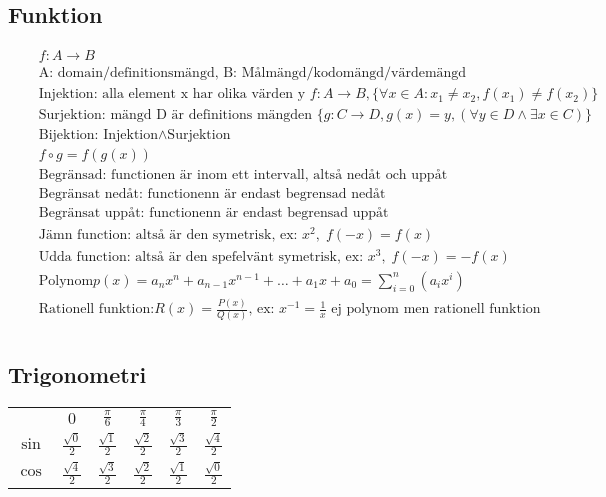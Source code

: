 \documentclass{article}
\begin{document}
\newpage

\subsection{Funktion}
\begin{align*}
  &\quad  f: A \to B \\
  &\quad  \text{A: domain/definitionsmängd, B: Målmängd/kodomängd/värdemängd} \\
  &\quad  \text{Injektion: alla element x har olika värden y } f: A \to B,
  \{{\forall x \in A: x_1 \neq x_2, f(x_1) \neq f(x_2)}\} \\
  &\quad  \text{Surjektion: mängd D är definitions mängden } \{g: C \to D, g(x)=y,
  (\forall y \in D \land \exists x \in C)\} \\
  &\quad  \text{Bijektion: } \text{Injektion} \land \text{Surjektion}  \\
  &\quad  f \circ g = f(g(x)) \\
  &\quad  \text{Begränsad: functionen är inom ett intervall, altså nedåt och uppåt} \\
  &\quad  \text{Begränsat nedåt: functionenn är endast begrensad nedåt} \\
  &\quad  \text{Begränsat uppåt: functionenn är endast begrensad uppåt} \\
  &\quad  \text{Jämn function: altså är den symetrisk, ex: } x^2, \; f(-x)=f(x) \\
  &\quad  \text{Udda function: altså är den spefelvänt symetrisk, ex: } x^3, \; f(-x)=-f(x) \\
  &\quad  \text{Polynom} p(x)=a_nx^n +a_{n-1}x^{n-1}+ \ldots +a_1x +a_0
  = \displaystyle\sum _ { i=0 } ^ { n } (a_i x^{i}) \\
  &\quad  \text{Rationell funktion:} R(x)=\frac{P(x)}{Q(x)} \text{, ex: } x^{-1}
  =\frac{1}{x} \text{ ej polynom men rationell funktion} \\
\end{align*}


\newpage

\subsection{Trigonometri}
\begin{center}
\begin{tabular}{ |c|c|c|c|c|c| } 
 \hline
        & $0$                  & $\frac{\pi}{6}$      & $\frac{\pi}{4}$      & $\frac{\pi}{3}$    & $\frac{\pi}{2}$ \\ 
 $\sin$ & $\frac{\sqrt{0}}{2}$ & $\frac{\sqrt{1}}{2}$ & $\frac{\sqrt{2}}{2}$ & $\frac{\sqrt{3}}{2}$ & $\frac{\sqrt{4}}{2}$ \\ 
 $\cos$ & $\frac{\sqrt{4}}{2}$ & $\frac{\sqrt{3}}{2}$ & $\frac{\sqrt{2}}{2}$ & $\frac{\sqrt{1}}{2}$ & $\frac{\sqrt{0}}{2}$ \\  
 \hline
\end{tabular}
\end{center}
\end{document}
